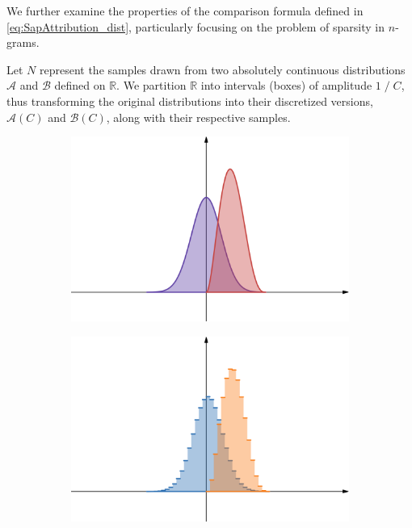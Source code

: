\bigskip
We further examine the properties of the comparison formula defined in  \cref{eq:SapAttribution_dist}, particularly focusing on the problem of sparsity in $n$-grams.

\noindent Let $N$ represent the samples drawn from two absolutely continuous distributions $\mathcal{A}$ and $\mathcal{B}$ defined on $\mathbb{R}$. We partition $\mathbb{R}$ into intervals (boxes) of amplitude $1 \; / \; C$, thus transforming the original distributions into their discretized versions, $\mathcal{A}(C)$ and $\mathcal{B}(C)$, along with their respective samples.

\begin{figure}[ht]
	\centering
	\begin{subfigure}{0.45\linewidth}
		\includegraphics[width=\linewidth]{Figures/exnmodel_AB_cont.png}
	\end{subfigure} \begin{subfigure}{0.45\linewidth}
		\includegraphics[width=\linewidth]{Figures/exnmodel_AB_disc.png}
	\end{subfigure}
\end{figure}

